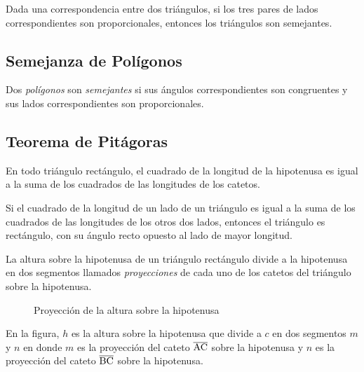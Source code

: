 \begin{theorem}
    Dada una correspondencia entre dos triángulos, si los tres pares de lados correspondientes son proporcionales, entonces los triángulos son semejantes.
\end{theorem}

\subsection{Semejanza de Polígonos}

\begin{definition}
    Dos \textit{polígonos} son \textit{semejantes} si sus ángulos correspondientes son congruentes y sus lados correspondientes son proporcionales.
\end{definition}


\subsection{Teorema de Pitágoras}

\begin{theorem}
    En todo triángulo rectángulo, el cuadrado de la longitud de la hipotenusa es igual a la suma de los cuadrados de las longitudes de los catetos.
\end{theorem}

\begin{theorem}
    Si el cuadrado de la longitud de un lado de un triángulo es igual a la suma de los cuadrados de las longitudes de los otros dos lados, entonces el triángulo es rectángulo, con su ángulo recto opuesto al lado de mayor longitud.
\end{theorem}

\begin{definition}

    La altura sobre la hipotenusa de un triángulo rectángulo divide a la hipotenusa en dos segmentos llamados \textit{proyecciones} de cada uno de los catetos del triángulo sobre la hipotenusa.

    \begin{figure}[!h]
        \centering
        
        \caption{Proyección de la altura sobre la hipotenusa}
        \label{fig:proyec-altura-hipotenusa}
    \end{figure}    

    En la figura, $h$ es la altura sobre la hipotenusa que divide a $c$ en dos segmentos $m$ y $n$ en donde $m$ es la proyección del cateto $\overline{\rm AC}$ sobre la hipotenusa y $n$ es la proyección del cateto $\overline{\rm BC}$ sobre la hipotenusa.
\end{definition}

